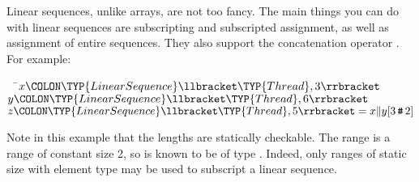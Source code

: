 Linear sequences, unlike arrays, are not too fancy. The main
things you can do with linear sequences are subscripting and subscripted assignment,
as well as assignment of entire sequences.  They also support
the concatenation operator \EXP{\|}.  For example:
\begin{Fortress}
{\tt~~}\pushtabs\=\+\(  x\COLON \TYP{LinearSequence}\llbracket\TYP{Thread},3\rrbracket \)\\
\(  y\COLON \TYP{LinearSequence}\llbracket\TYP{Thread},6\rrbracket\)\\
\(  z\COLON \TYP{LinearSequence}\llbracket\TYP{Thread},5\rrbracket = x \| y[3\mathinner{\hbox{\tt\char'43}}2]\)\-\\\poptabs
\end{Fortress}
Note in this example that the lengths are statically checkable.  The range
 is a range of constant size 2,
so 
is known to be of type .
Indeed, only ranges of static size with element type  may be used to subscript a linear sequence.

